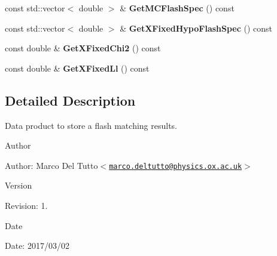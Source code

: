 \begin{DoxyCompactItemize}
\item 
\hypertarget{classubana_1_1FlashMatch_ad55287aa6f9ea080a5c875ea60090ae3}{const std\-::vector$<$ double $>$ \& {\bfseries \-Get\-M\-C\-Flash\-Spec} () const }\label{classubana_1_1FlashMatch_ad55287aa6f9ea080a5c875ea60090ae3}

\item 
\hypertarget{classubana_1_1FlashMatch_ad674b8ab8efe7f7850cdb5d689429907}{const std\-::vector$<$ double $>$ \& {\bfseries \-Get\-X\-Fixed\-Hypo\-Flash\-Spec} () const }\label{classubana_1_1FlashMatch_ad674b8ab8efe7f7850cdb5d689429907}

\item 
\hypertarget{classubana_1_1FlashMatch_a547468a6f20b51582c63bee251e327bd}{const double \& {\bfseries \-Get\-X\-Fixed\-Chi2} () const }\label{classubana_1_1FlashMatch_a547468a6f20b51582c63bee251e327bd}

\item 
\hypertarget{classubana_1_1FlashMatch_aced716901d42319db1d3054b31d22cc6}{const double \& {\bfseries \-Get\-X\-Fixed\-Ll} () const }\label{classubana_1_1FlashMatch_aced716901d42319db1d3054b31d22cc6}

\end{DoxyCompactItemize}


\subsection{\-Detailed \-Description}
\-Data product to store a flash matching results. 

\begin{DoxyAuthor}{\-Author}

\end{DoxyAuthor}
\begin{DoxyParagraph}{\-Author\-:}
\-Marco \-Del \-Tutto$<$\href{mailto:marco.deltutto@physics.ox.ac.uk}{\tt marco.\-deltutto@physics.\-ox.\-ac.\-uk}$>$ 
\end{DoxyParagraph}


\begin{DoxyVersion}{\-Version}

\end{DoxyVersion}
\begin{DoxyParagraph}{\-Revision\-:}
1. 
\end{DoxyParagraph}


\begin{DoxyDate}{\-Date}

\end{DoxyDate}
\begin{DoxyParagraph}{\-Date\-:}
2017/03/02 
\end{DoxyParagraph}


